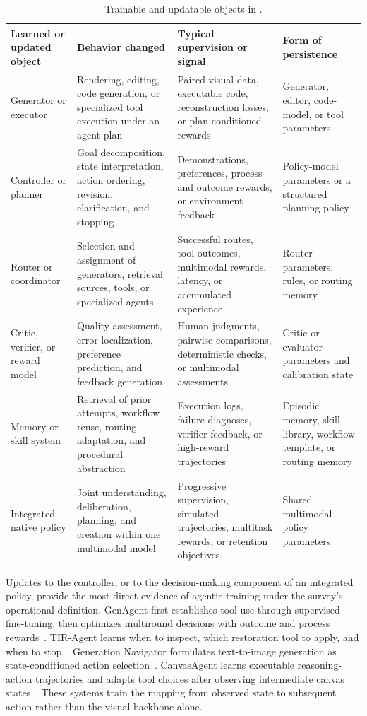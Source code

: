 \begin{table}[t]
  \caption{Trainable and updatable objects in \AVG{}.}
  \label{tab:training-targets}
  \small
  \begin{tabularx}{\textwidth}{@{}p{}XXX@{}}
    \toprule
    Learned or updated object & Behavior changed & Typical supervision or signal & Form of persistence \\
    \midrule
    Generator or executor & Rendering, editing, code generation, or specialized tool execution under an agent plan & Paired visual data, executable code, reconstruction losses, or plan-conditioned rewards & Generator, editor, code-model, or tool parameters \\
    Controller or planner & Goal decomposition, state interpretation, action ordering, revision, clarification, and stopping & Demonstrations, preferences, process and outcome rewards, or environment feedback & Policy-model parameters or a structured planning policy \\
    Router or coordinator & Selection and assignment of generators, retrieval sources, tools, or specialized agents & Successful routes, tool outcomes, multimodal rewards, latency, or accumulated experience & Router parameters, rules, or routing memory \\
    Critic, verifier, or reward model & Quality assessment, error localization, preference prediction, and feedback generation & Human judgments, pairwise comparisons, deterministic checks, or multimodal assessments & Critic or evaluator parameters and calibration state \\
    Memory or skill system & Retrieval of prior attempts, workflow reuse, routing adaptation, and procedural abstraction & Execution logs, failure diagnoses, verifier feedback, or high-reward trajectories & Episodic memory, skill library, workflow template, or routing memory \\
    Integrated native policy & Joint understanding, deliberation, planning, and creation within one multimodal model & Progressive supervision, simulated trajectories, multitask rewards, or retention objectives & Shared multimodal policy parameters \\
    \bottomrule
  \end{tabularx}
\end{table}
\FloatBarrier

Updates to the controller, or to the decision-making component of an integrated policy, provide the most direct evidence of agentic training under the survey's operational definition. GenAgent first establishes tool use through supervised fine-tuning, then optimizes multiround decisions with outcome and process rewards~\cite{jiang2026genagent}. TIR-Agent learns when to inspect, which restoration tool to apply, and when to stop~\cite{avg260327742}. Generation Navigator formulates text-to-image generation as state-conditioned action selection~\cite{avg260517969}. CanvasAgent learns executable reasoning-action trajectories and adapts tool choices after observing intermediate canvas states~\cite{avg260705465}. These systems train the mapping from observed state to subsequent action rather than the visual backbone alone.

